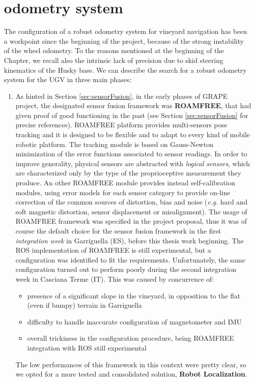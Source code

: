 \section{odometry system}\label{sec:odometrySystem}

The configuration of a robust odometry system for vineyard navigation has been a workpoint since the beginning of the project, because of the strong instability of the wheel odometry. To the reasons mentioned at the beginning of the Chapter, we recall also the intrinsic lack of precision due to skid steering kinematics of the Husky base.
We can describe the search for a robust odometry system for the \ac{UGV} in three main phases:
\begin{enumerate}
	\item As hinted in Section \ref{sec:sensorFusion}, in the early phases of \ac{GRAPE} project, the designated sensor fusion framework was \textbf{ROAMFREE}, that had given proof of good functioning in the past (see Section \ref{sec:sensorFusion} for precise references). ROAMFREE platform provides multi-sensors pose tracking and it is designed to be flexible and to adapt to every kind of mobile robotic platform. The tracking module is based on Gauss-Newton minimization of the error functions associated to sensor readings. In order to improve generality, physical sensors are abstracted with \textit{logical sensors}, which are characterized only by the type of the proprioceptive measurement they produce. An other ROAMFREE module provides instead self-calibration modules, using error models for each sensor category to provide on-line correction of the common sources of distortion, bias and noise (\textit{e.g.} hard and soft magnetic distortion, sensor displacement or misalignment). The usage of ROAMFREE framework was specified in the project proposal, thus it was of course the default choice for the sensor fusion framework in the first \textit{integration week} in Garriguella (ES), before this thesis work beginning. The \ac{ROS} implementation of ROAMFREE is still experimental, but a configuration was identified to fit the requirements. Unfortunately, the same configuration turned out to perform poorly during the second integration week in Casciana Terme (IT). This was caused by concurrence of:
	\begin{itemize}
		\item presence of a significant slope in the vineyard, in opposition to the flat (even if bumpy) terrain in Garriguella
		\item difficulty to handle inaccurate configuration of magnetometer and \ac{IMU}
		\item overall trickiness in the configuration procedure, being ROAMFREE integration with \ac{ROS} still experimental
	\end{itemize}
	The low performances of this framework in this context were pretty clear, so we opted for a more tested and consolidated solution, \textbf{Robot Localization}.
	

\end{enumerate}
